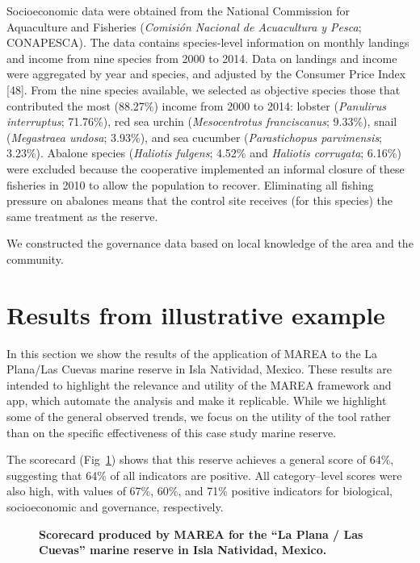 \documentclass[10pt,letterpaper]{article}
\begin{document}
Socioeconomic data were obtained from the National Commission for Aquaculture and Fisheries (\emph{Comisión Nacional de Acuacultura y Pesca}; CONAPESCA). The data contains species-level information on monthly landings and income from nine species from 2000 to 2014. Data on landings and income were aggregated by year and species, and adjusted by the Consumer Price Index {[}48{]}. From the nine species available, we selected as objective species those that contributed the most (88.27\%) income from 2000 to 2014: lobster (\emph{Panulirus interruptus}; 71.76\%), red sea urchin (\emph{Mesocentrotus franciscanus}; 9.33\%), snail (\emph{Megastraea undosa}; 3.93\%), and sea cucumber (\emph{Parastichopus parvimensis}; 3.23\%). Abalone species (\emph{Haliotis fulgens}; 4.52\% and \emph{Haliotis corrugata}; 6.16\%) were excluded because the cooperative implemented an informal closure of these fisheries in 2010 to allow the population to recover. Eliminating all fishing pressure on abalones means that the control site receives (for this species) the same treatment as the reserve.

We constructed the governance data based on local knowledge of the area and the community.

\section*{Results from illustrative example}\label{results-from-illustrative-example}

In this section we show the results of the application of MAREA to the La Plana/Las Cuevas marine reserve in Isla Natividad, Mexico. These results are intended to highlight the relevance and utility of the MAREA framework and app, which automate the analysis and make it replicable. While we highlight some of the general observed trends, we focus on the utility of the tool rather than on the specific effectiveness of this case study marine reserve.

The scorecard (Fig~\ref{fig4}) shows that this reserve achieves a general score of 64\%, suggesting that 64\% of all indicators are positive. All category--level scores were also high, with values of 67\%, 60\%, and 71\% positive indicators for biological, socioeconomic and governance, respectively.

\begin{figure}[!h]
\caption{{\bf Scorecard produced by MAREA for the ``La Plana / Las Cuevas'' marine reserve in Isla Natividad, Mexico.}}
\label{fig4}
\end{figure}
\end{document}
